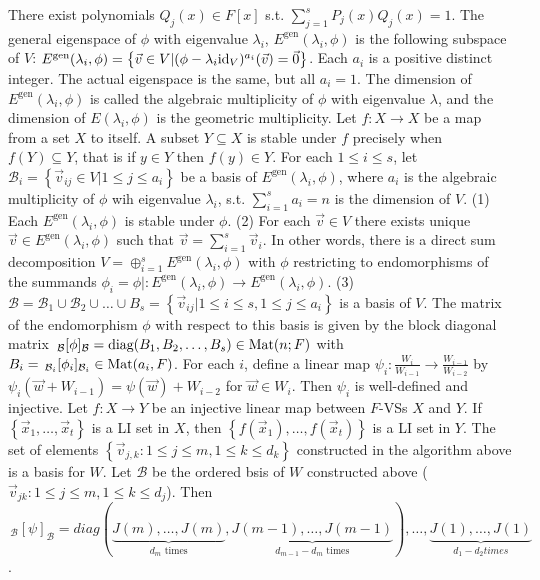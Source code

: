  There exist polynomials $Q_j(x) \in F[x]$ s.t. $\sum_{j=1}^sP_j(x)Q_j(x) = 1$.
 The general eigenspace of $\phi$ with eigenvalue $\lambda_i$, $E^{\mathrm{gen}}(\lambda_i, \phi)$ is the following subspace of $V$: $E^{\mathrm{gen}}(\lambda_i, \phi) = \left\{ \vec{v} \in V | (\phi - \lambda_i \text{id}_V)^{a_i}(\vec{v}) = \vec{0} \right\}$. Each $a_i$ is a positive distinct integer. The actual eigenspace is the same, but all $a_i=1$. The dimension of $E^\mathrm{gen} (\lambda_i, \phi)$ is called the algebraic multiplicity of $\phi$ with eigenvalue $\lambda$, and the dimension of $E(\lambda_i, \phi)$ is the geometric multiplicity. 
 Let $f : X \to X$ be a map from a set $X$ to itself. A subset $Y \subseteq X$ is stable under $f$ precisely when $f(Y) \subseteq Y$, that is if $y \in Y$ then $f(y) \in Y$.
 For each $1 \le i \le s$, let $\mathcal{B}_i = \left\{ \vec{v}_{ij} \in V | 1 \le j \le a_i \right\}$ be a basis of $E^{\mathrm{gen}}(\lambda_i, \phi)$, where $a_i$ is the algebraic multiplicity of $\phi$ wih eigenvalue $\lambda_i$, s.t. $\sum_{i=1}^s a_i = n$ is the dimension of $V$.
(1) Each $E^\mathrm{gen} (\lambda_i, \phi)$ is stable under $\phi$.
(2) For each $\vec{v} \in V$ there exists unique $\vec{v} \in E^\mathrm{gen} (\lambda_i, \phi)$ such that $\vec{v} = \sum_{i=1}^s \vec{v}_i$. In other words, there is a direct sum decomposition $V = \oplus_{i=1}^s E^\mathrm{gen} (\lambda_i, \phi)$ with $\phi$ restricting to endomorphisms of the summands $\phi_i = \phi| : E^\mathrm{gen} (\lambda_i, \phi) \to E^\mathrm{gen} (\lambda_i, \phi)$.
(3) $\mathcal{B} = \mathcal{B}_1 \cup \mathcal{B}_2 \cup \dots \cup B_s = \left\{ \vec{v}_{ij} | 1 \le i \le s, 1 \le j \le a_i \right\}$ is a basis of $V$. The matrix of the endomorphism $\phi$ with respect to this basis is given by the block diagonal matrix $\,_{\mathcal{B}}[\phi]_{\mathcal{B}} = \text{diag}(B_1, B_2, \dots, B_s) \in \text{Mat}(n; F)$ with $B_i = \,_{\mathcal{B}_i}[\phi_i]_{\mathcal{B}_i} \in \text{Mat}(a_i, F)$.
 For each $i$, define a linear map $\psi_i : \frac{W_i}{W_{i-1}} \to \frac{W_{i-1}}{W_{i-2}}$ by $\psi_i(\vec{w} + W_{i-1}) = \psi(\vec{w}) + W_{i-2}$ for $\vec{w} \in W_i$. Then $\psi_i$ is well-defined and injective.
 Let $f : X \to Y$ be an injective linear map between $F$-VSs $X$ and $Y$. If $\left\{ \vec{x}_1, \dots, \vec{x}_t \right\}$ is a LI set in $X$, then $\left\{ f(\vec{x}_1), \dots, f(\vec{x}_t) \right\}$ is a LI set in $Y$.
 The set of elements $\left\{ \vec{v}_{j,k} : 1 \le j \le m, 1 \le k \le d_k \right\}$ constructed in the algorithm above is a basis for $W$.
 Let $\mathcal{B}$ be the ordered bsis of $W$ constructed above ($\vec{v}_{jk} : 1 \le j \le m, 1 \le k \le d_j$). Then
$\,_{\mathcal{B}}[\psi]_{\mathcal{B}} = diag(\underbrace{J(m), \dots, J(m)}_{\text{$d_m$ times}}, \underbrace{J(m-1), \dots, J(m-1)}_{\text{$d_{m-1}-d_m$ times}}), \dots, \underbrace{J(1), \dots, J(1)}_{\text{$d_1 - d_2$} times}$.